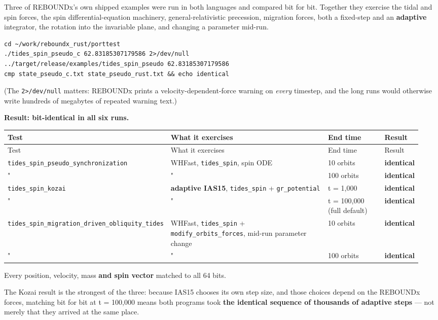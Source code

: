 \documentclass[11pt]{article}
\begin{document}
Three of REBOUNDx's own shipped examples were run in both languages and compared bit for bit. Together they exercise the tidal and spin forces, the spin differential-equation machinery, general-relativistic precession, migration forces, both a fixed-step and an \textbf{adaptive} integrator, the rotation into the invariable plane, and changing a parameter mid-run.

\begin{lstlisting}
cd ~/work/reboundx_rust/porttest
./tides_spin_pseudo_c 62.83185307179586 2>/dev/null
../target/release/examples/tides_spin_pseudo 62.83185307179586
cmp state_pseudo_c.txt state_pseudo_rust.txt && echo identical
\end{lstlisting}

(The \texttt{2>/dev/null} matters: REBOUNDx prints a velocity-dependent-force warning on \emph{every} timestep, and the long runs would otherwise write hundreds of megabytes of repeated warning text.)

\textbf{Result: bit-identical in all six runs.}

\begin{longtable}{L{0.270\linewidth}L{0.426\linewidth}L{0.156\linewidth}L{0.098\linewidth}}
\toprule
Test & What it exercises & End time & Result \\
\midrule
\endfirsthead
\toprule
Test & What it exercises & End time & Result \\
\midrule
\endhead
\texttt{tides\_spin\_pseudo\_synchronization} & WHFast, \texttt{tides\_spin}, spin ODE & 10 orbits & \textbf{identical} \\
" & " & 100 orbits & \textbf{identical} \\
\texttt{tides\_spin\_kozai} & \textbf{adaptive IAS15}, \texttt{tides\_spin} + \texttt{gr\_potential} & t = 1,000 & \textbf{identical} \\
" & " & t = 100,000 (full default) & \textbf{identical} \\
\texttt{tides\_spin\_migration\_driven\_obliquity\_tides} & WHFast, \texttt{tides\_spin} + \texttt{modify\_orbits\_forces}, mid-run parameter change & 10 orbits & \textbf{identical} \\
" & " & 100 orbits & \textbf{identical} \\
\bottomrule
\end{longtable}

Every position, velocity, mass \textbf{and spin vector} matched to all 64 bits.

The Kozai result is the strongest of the three: because IAS15 chooses its own step size, and those choices depend on the REBOUNDx forces, matching bit for bit at t = 100,000 means both programs took \textbf{the identical sequence of thousands of adaptive steps} --- not merely that they arrived at the same place.
\end{document}
